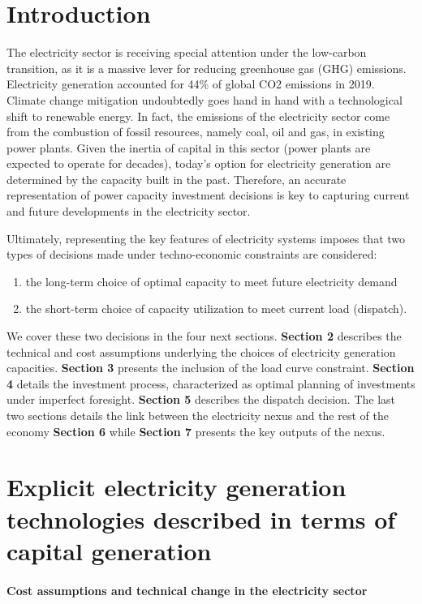 \section{Introduction}
The electricity sector is receiving special attention under the low-carbon transition, as it is a massive lever for reducing greenhouse gas (GHG) emissions. Electricity generation accounted for 44\% of global CO2 emissions in 2019. Climate change mitigation undoubtedly goes hand in hand with a technological shift to renewable energy. In fact, the emissions of the electricity sector come from the combustion of fossil resources, namely coal, oil and gas, in existing power plants. Given the inertia of capital in this sector (power plants are expected to operate for decades), today's option for electricity generation are determined by the capacity built in the past. Therefore, an accurate representation of power capacity investment decisions is key to capturing current and future developments in the electricity sector.


Ultimately, representing the key features of electricity systems imposes that two types of decisions made under techno-economic constraints are considered:
\begin{enumerate}
    \item the long-term choice of optimal capacity to meet future electricity demand
    \item the short-term choice of capacity utilization to meet current load (dispatch).
\end{enumerate}

We cover these two decisions in the four next sections. \textbf{Section 2} describes the technical and cost assumptions underlying the choices of electricity generation capacities. \textbf{Section 3} presents the inclusion of the load curve constraint. \textbf{Section 4} details the investment process, characterized as optimal planning of investments under imperfect foresight. \textbf{Section 5} describes the dispatch decision. The last two sections details the link between the electricity nexus and the rest of the economy \textbf{Section 6} while \textbf{Section 7} presents the key outputs of the nexus.

\section{Explicit electricity generation technologies described in terms of capital generation}

\paragraph{ Cost assumptions and technical change in the electricity sector}

